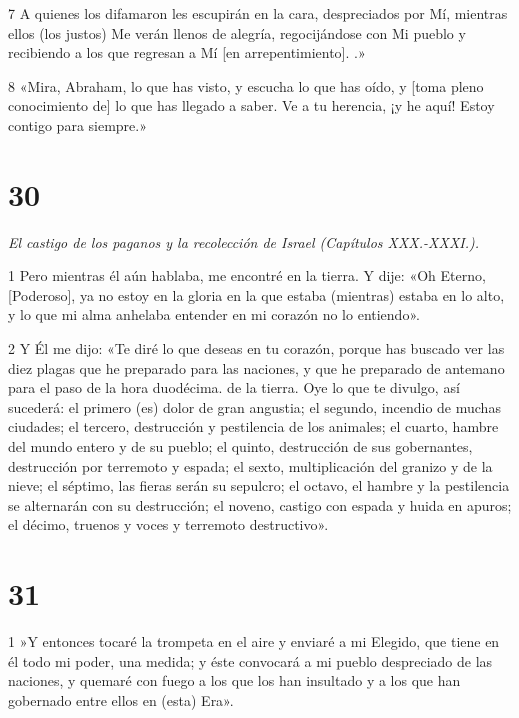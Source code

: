 \par 7 A quienes los difamaron les escupirán en la cara, despreciados por Mí, mientras ellos (los justos) Me verán llenos de alegría, regocijándose con Mi pueblo y recibiendo a los que regresan a Mí [en arrepentimiento]. .»

\par 8 «Mira, Abraham, lo que has visto, y escucha lo que has oído, y [toma pleno conocimiento de] lo que has llegado a saber. Ve a tu herencia, ¡y he aquí! Estoy contigo para siempre.»

\chapter{30}

\par \textit{El castigo de los paganos y la recolección de Israel (Capítulos XXX.-XXXI.).}

\par 1 Pero mientras él aún hablaba, me encontré en la tierra. Y dije: «Oh Eterno, [Poderoso], ya no estoy en la gloria en la que estaba (mientras) estaba en lo alto, y lo que mi alma anhelaba entender en mi corazón no lo entiendo».

\par 2 Y Él me dijo: «Te diré lo que deseas en tu corazón, porque has buscado ver las diez plagas que he preparado para las naciones, y que he preparado de antemano para el paso de la hora duodécima. de la tierra. Oye lo que te divulgo, así sucederá: el primero (es) dolor de gran angustia; el segundo, incendio de muchas ciudades; el tercero, destrucción y pestilencia de los animales; el cuarto, hambre del mundo entero y de su pueblo; el quinto, destrucción de sus gobernantes, destrucción por terremoto y espada; el sexto, multiplicación del granizo y de la nieve; el séptimo, las fieras serán su sepulcro; el octavo, el hambre y la pestilencia se alternarán con su destrucción; el noveno, castigo con espada y huida en apuros; el décimo, truenos y voces y terremoto destructivo».

\chapter{31}

\par 1 »Y entonces tocaré la trompeta en el aire y enviaré a mi Elegido, que tiene en él todo mi poder, una medida; y éste convocará a mi pueblo despreciado de las naciones, y quemaré con fuego a los que los han insultado y a los que han gobernado entre ellos en (esta) Era».

